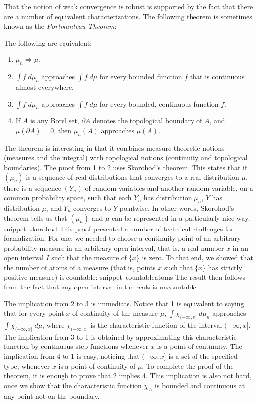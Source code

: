 \documentclass{svjour3}
\newcommand{\Snippet}[1]{\csname snippet--#1\endcsname}
\begin{document}
That the notion of weak convergence is robust is supported by the fact that there are a number of equivalent characterizations. The following theorem is sometimes known as the \emph{Portmanteau Theorem}:
\begin{theorem}
The following are equivalent:
\begin{enumerate}
 \item $\mu_n \Rightarrow \mu$.
 \item $\int f \; d\mu_n$ approaches $\int f \; d\mu$ for every bounded function $f$ that is continuous almost everywhere.
 \item $\int f \; d\mu_n$ approaches $\int f \; d\mu$ for every bounded, continuous function $f$.
 \item If $A$ is any Borel set, $\partial A$ denotes the topological boundary of $A$, and $\mu(\partial A) = 0$, then $\mu_n(A)$ approaches $\mu(A)$. 
\end{enumerate}
\end{theorem}
The theorem is interesting in that it combines measure-theoretic notions (measures and the integral) with topological notions (continuity and topological boundaries). The proof from 1 to 2 uses Skorohod's theorem. This states that if $(\mu_n)$ is a sequence of real distributions that converges to a real distribution $\mu$, there is a sequence $(Y_n)$ of random variables and another random variable, on a common probability space, such that each $Y_n$ has distribution $\mu_n$, $Y$ has distribution $\mu$, and $Y_n$ converges to $Y$ pointwise. In other words, Skorohod's theorem tells us that $(\mu_n)$ and $\mu$ can be represented in a particularly nice way. 
\Snippet{skorohod}
This proof presented a number of technical challenges for formalization. For one, we needed to choose a continuity point of an arbitrary probability measure in an arbitrary open interval, that is, a real number $x$ in an open interval $I$ such that the measure of $\{x\}$ is zero. To that end, we showed that the number of atoms of a measure (that is, points $x$ such that $\{x\}$ has strictly positive measure) is countable:
\Snippet{countableatoms}
The result then follows from the fact that any open interval in the reals is uncountable. 

The implication from 2 to 3 is immediate. Notice that 1 is equivalent to saying that for every point $x$ of continuity of the measure $\mu$, $\int \chi_{(-\infty,x]} \; d\mu_n$ approaches $\int \chi_{(-\infty,x]} \; d\mu$, where $\chi_{(-\infty,x]}$ is the characteristic function of the interval $(-\infty,x]$. The implication from 3 to 1 is obtained by approximating this characteristic function by continuous step functions whenever $x$ is a point of continuity. The implication from 4 to 1 is easy, noticing that $(-\infty,x]$ is a set of the specified type, whenever $x$ is a point of continuity of $\mu$. To complete the proof of the theorem, it is enough to prove that 2 implies 4. This implication is also not hard, once we show that the characteristic function $\chi_A$ is bounded and continuous at any point not on the boundary.
\end{document}
